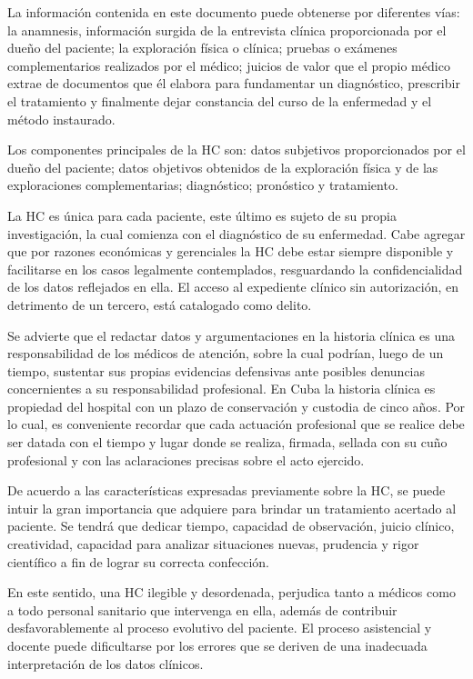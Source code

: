 La información contenida en este documento puede obtenerse por diferentes vías: la anamnesis, información surgida de la entrevista clínica proporcionada por el dueño del paciente; la exploración física o clínica; pruebas o exámenes complementarios realizados por el médico; juicios de valor que el propio médico extrae de documentos que él elabora para fundamentar un diagnóstico, prescribir el tratamiento y finalmente dejar constancia del curso de la enfermedad y el método instaurado.  

Los componentes principales de la HC son: datos subjetivos proporcionados por el dueño del paciente; datos objetivos obtenidos de la exploración física y de las exploraciones complementarias; diagnóstico; pronóstico y tratamiento.    

La HC es única para cada paciente, este último es sujeto de su propia investigación, la cual comienza con el diagnóstico de su enfermedad. Cabe agregar que por razones económicas y gerenciales la HC debe estar siempre disponible y facilitarse en los casos legalmente contemplados, resguardando la confidencialidad de los datos reflejados en ella. El acceso al expediente clínico sin autorización, en detrimento de un tercero, está catalogado como delito.

Se advierte que el redactar datos y argumentaciones en la historia clínica es una responsabilidad de los médicos de atención, sobre la cual podrían, luego de un tiempo, sustentar sus propias evidencias defensivas ante posibles denuncias concernientes a su responsabilidad profesional. En Cuba la historia clínica es propiedad del hospital con un plazo de conservación y custodia de cinco años. Por lo cual, es conveniente recordar que cada actuación profesional que se realice debe ser datada con el tiempo y lugar donde se realiza, firmada, sellada con su cuño profesional y con las aclaraciones precisas sobre el acto ejercido.  

De acuerdo a las características expresadas previamente sobre la HC, se puede intuir la gran importancia que adquiere para brindar un tratamiento acertado al paciente. Se tendrá que dedicar tiempo, capacidad de observación, juicio clínico, creatividad, capacidad para analizar situaciones nuevas, prudencia y rigor científico a fin de lograr su correcta confección. 

En este sentido, una HC ilegible y desordenada, perjudica tanto a médicos como a todo personal sanitario que intervenga en ella, además de contribuir desfavorablemente al proceso evolutivo del paciente. El proceso asistencial y docente puede dificultarse por los errores que se deriven de una inadecuada interpretación de los datos clínicos.  

